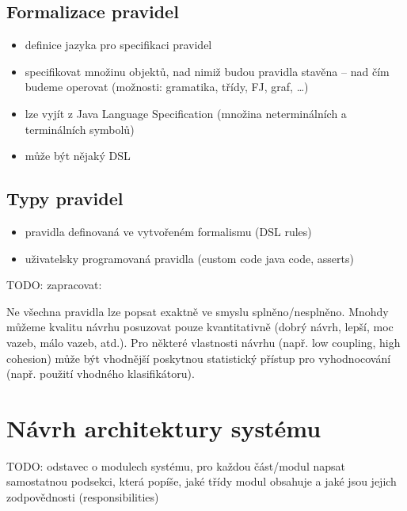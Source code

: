 
\subsection{Formalizace pravidel}

\begin{itemize}
\item definice jazyka pro specifikaci pravidel
\item specifikovat množinu objektů, nad nimiž budou pravidla stavěna -- nad čím budeme operovat (možnosti: gramatika, třídy, FJ, graf, \ldots)
\item lze vyjít z Java Language Specification (množina neterminálních a terminálních symbolů)
\item může být nějaký DSL
\end{itemize}

\subsection{Typy pravidel}
\begin{itemize}
\item pravidla definovaná ve vytvořeném formalismu (DSL rules)
\item uživatelsky programovaná pravidla (custom code java code, asserts)
\end{itemize}

TODO: zapracovat:

Ne všechna pravidla lze popsat exaktně ve smyslu splněno/nesplněno. Mnohdy můžeme kvalitu návrhu posuzovat pouze kvantitativně (dobrý návrh, lepší, moc vazeb, málo vazeb, atd.). Pro některé vlastnosti návrhu (např. low coupling, high cohesion) může být vhodnější poskytnou statistický přístup pro vyhodnocování (např. použití vhodného klasifikátoru).

\section{Návrh architektury systému}
\label{design-architecture}
TODO: odstavec o modulech systému, pro každou část/modul napsat samostatnou podsekci, která popíše, jaké třídy modul obsahuje a jaké jsou jejich zodpovědnosti (responsibilities)



